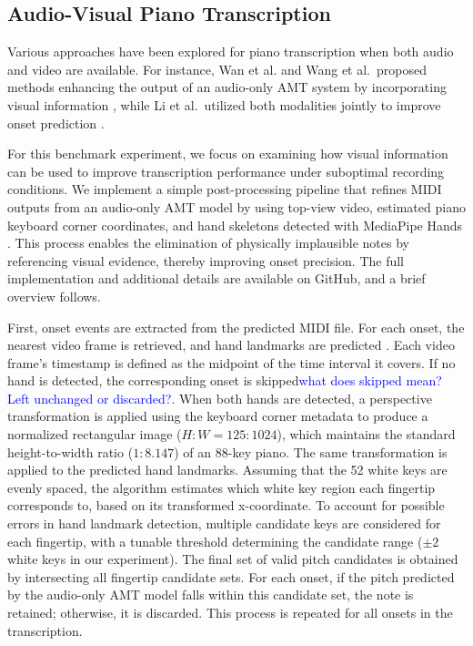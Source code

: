 \documentclass{article}
\newcommand{\alex}[1]{\textcolor{blue}{#1}}%
\begin{document}
\subsection{Audio-Visual Piano Transcription}

Various approaches have been explored for piano transcription when both audio and video are available. For instance, Wan et al. and Wang et al.\ proposed methods  enhancing the output of an audio-only AMT system by incorporating visual information \cite{CJE15Wan, DAFx21Wang}, while Li et al.\ utilized both modalities jointly to improve onset prediction \cite{ICASSPW23Li, TASLP24Li}. 

For this benchmark experiment, we focus on examining how visual information can be used to improve transcription performance under suboptimal recording conditions. We implement a simple post-processing pipeline that refines MIDI outputs from an audio-only AMT model by using top-view video, estimated piano keyboard corner coordinates, and hand skeletons detected with MediaPipe Hands \cite{arXiv20Zhang}. This process enables the elimination of physically implausible notes by referencing visual evidence, thereby improving onset precision. The full implementation and additional details are available on GitHub, and a brief overview follows.

First, onset events are extracted from the predicted MIDI file. For each onset, the nearest video frame is retrieved, and hand landmarks are predicted \cite{arXiv20Zhang}. Each video frame's timestamp is defined as the midpoint of the time interval it covers. If no hand is detected, the corresponding onset is skipped\alex{what does skipped mean? Left unchanged or discarded?}. When both hands are detected, a perspective transformation is applied using the keyboard corner metadata to produce a normalized rectangular image ($H:W=125:1024$), which maintains the standard height-to-width ratio ($1:8.147$) of an 88-key piano. The same transformation is applied to the predicted hand landmarks. Assuming that the 52 white keys are evenly spaced, the algorithm estimates which white key region each fingertip corresponds to, based on its transformed x-coordinate. To account for possible errors in hand landmark detection, multiple candidate keys are considered for each fingertip, with a tunable threshold determining the candidate range ($\pm2$ white keys in our experiment). The final set of valid pitch candidates is obtained by intersecting all fingertip candidate sets. For each onset, if the pitch predicted by the audio-only AMT model falls within this candidate set, the note is retained; otherwise, it is discarded. This process is repeated for all onsets in the transcription.
\end{document}
